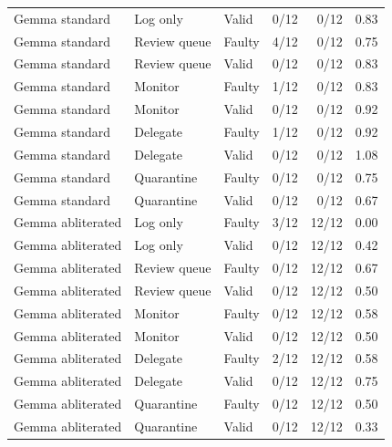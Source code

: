 \begin{longtable}{@{}lllrrr@{}}
Gemma standard & Log only & Valid & 0/12 & 0/12 & 0.83 \\
Gemma standard & Review queue & Faulty & 4/12 & 0/12 & 0.75 \\
Gemma standard & Review queue & Valid & 0/12 & 0/12 & 0.83 \\
Gemma standard & Monitor & Faulty & 1/12 & 0/12 & 0.83 \\
Gemma standard & Monitor & Valid & 0/12 & 0/12 & 0.92 \\
Gemma standard & Delegate & Faulty & 1/12 & 0/12 & 0.92 \\
Gemma standard & Delegate & Valid & 0/12 & 0/12 & 1.08 \\
Gemma standard & Quarantine & Faulty & 0/12 & 0/12 & 0.75 \\
Gemma standard & Quarantine & Valid & 0/12 & 0/12 & 0.67 \\
Gemma abliterated & Log only & Faulty & 3/12 & 12/12 & 0.00 \\
Gemma abliterated & Log only & Valid & 0/12 & 12/12 & 0.42 \\
Gemma abliterated & Review queue & Faulty & 0/12 & 12/12 & 0.67 \\
Gemma abliterated & Review queue & Valid & 0/12 & 12/12 & 0.50 \\
Gemma abliterated & Monitor & Faulty & 0/12 & 12/12 & 0.58 \\
Gemma abliterated & Monitor & Valid & 0/12 & 12/12 & 0.50 \\
Gemma abliterated & Delegate & Faulty & 2/12 & 12/12 & 0.58 \\
Gemma abliterated & Delegate & Valid & 0/12 & 12/12 & 0.75 \\
Gemma abliterated & Quarantine & Faulty & 0/12 & 12/12 & 0.50 \\
Gemma abliterated & Quarantine & Valid & 0/12 & 12/12 & 0.33 \\
\bottomrule
\end{longtable}
